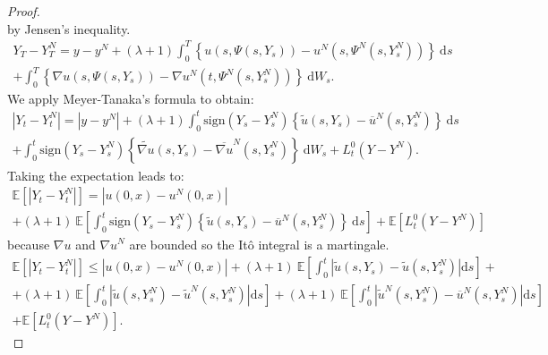 \documentclass[11pt]{article}
\newcommand{\E}{\mathbb{E}}
\newcommand{\di}{\mathrm{d}}
\begin{document}
\begin{proof}
\begin{equation}
    \end{equation}    
    by Jensen's inequality. 
    \begin{multline*}
    Y_T-Y_T^N = y-y^N + (\lambda + 1 )\int_0^T\left\{u\left(s,\Psi\left(s,Y_s\right)\right)-u^N\left(s,\Psi^N\left(s,Y_s^N\right)\right)\right\}\ \di s\\ + \int_0^T\left\{\nabla u\left(s,\Psi\left(s,Y_s\right)\right)-\nabla u^N\left(t,\Psi^N\left(s,Y_s^N\right)\right)\right\}\ \di W_s.
    \end{multline*}
    We apply Meyer-Tanaka's formula to obtain:
    \begin{multline*}
    \left|Y_t-Y_t^N\right| = \left|y-y^N\right| + (\lambda + 1) \int_0^t\mathrm{sign}(Y_s-Y_s^N)\left\{\widetilde{u}\left(s,Y_s\right)-\overline{u}^N\left(s,Y_s^N\right)\right\}\ \di s\\ + \int_0^t\mathrm{sign}(Y_s-Y_s^N)\left\{\widetilde{\nabla u}\left(s,Y_s\right)-\overline{\nabla u}^N\left(s,Y_s^N\right)\right\}\ \di W_s + L_t^0(Y-Y^N).
     \end{multline*}    
    Taking the expectation leads to:
    \begin{multline*}
    \E\left[\left|Y_t-Y_t^N\right|\right] =  \left|u(0,x)-u^N(0,x)\right|\\ + (\lambda + 1)\ \E\left[\int_0^t\mathrm{sign}(Y_s-Y_s^N)\left\{\widetilde{u}\left(s,Y_s\right)-\overline{u}^N\left(s,Y_s^N\right)\right\}\ \di s\right] + \E \left[L_t^0(Y-Y^N)\right]
    \end{multline*}
    because ${\nabla u}$ and ${\nabla u}^N$ are bounded so the Itô integral is a martingale.    
    \begin{multline*}
    \E\left[\left|Y_t-Y_t^N\right|\right]\leq \left|u(0,x)-u^N(0,x)\right| + (\lambda + 1)\ \E\left[\int_0^t\left|\widetilde{u}\left(s,Y_s\right)-\widetilde{u}\left(s,Y_s^N\right)\right| \di s\right]+ \\ + (\lambda + 1)\ \E\left[\int_0^t\left|\widetilde{u}\left(s,Y_s^N\right)-\widetilde{u}^N\left(s,Y_s^N\right)\right| \di s\right] + (\lambda + 1)\ \E\left[\int_0^t\left|\widetilde{u}^N\left(s,Y_s^N\right)-\overline{u}^N\left(s,Y_s^N\right)\right| \di s\right]\\ + \E \left[L_t^0(Y-Y^N)\right].
    \end{multline*}    

\end{proof}
\end{document}
